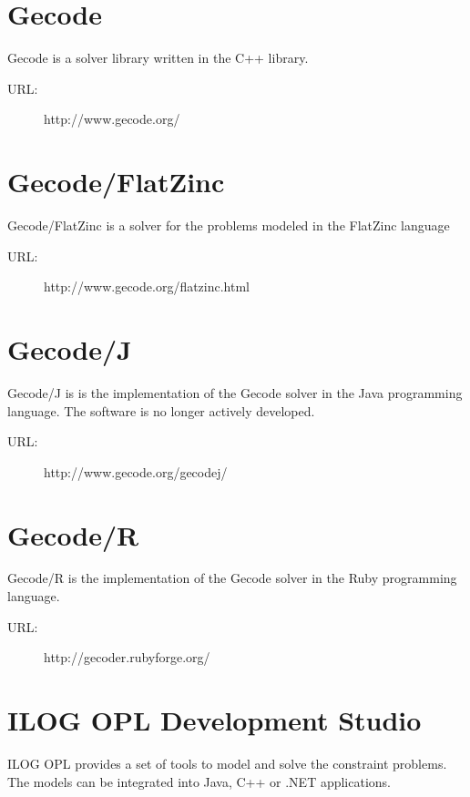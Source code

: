 \section*{Gecode}
Gecode is a solver library written in the C++ library. 

\begin{description}
	\item[URL:] http://www.gecode.org/
\end{description}  

\section*{Gecode/FlatZinc}
Gecode/FlatZinc is a solver for the problems modeled in the FlatZinc language  

\begin{description}
	\item[URL:] http://www.gecode.org/flatzinc.html
\end{description}  

\section*{Gecode/J}
Gecode/J is is the implementation of the Gecode solver in the Java programming language.
The software is no longer actively developed. 

\begin{description}
	\item[URL:] http://www.gecode.org/gecodej/
\end{description}  

\section*{Gecode/R}
Gecode/R is the implementation of the Gecode solver in the Ruby programming language. 

\begin{description}
	\item[URL:] http://gecoder.rubyforge.org/
\end{description}  

\section*{ILOG OPL Development Studio}
ILOG OPL provides a set of tools to model and solve the constraint problems. The
models can be integrated into Java, C++ or .NET applications.

